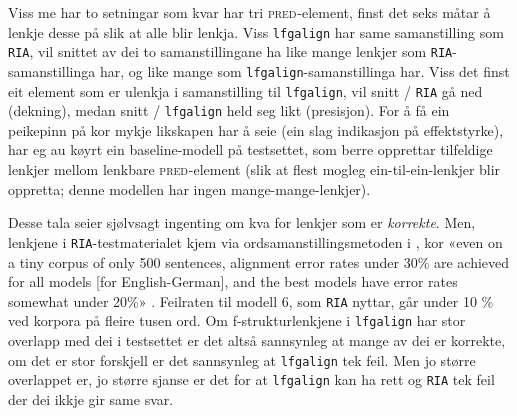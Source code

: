 \documentclass[12pt,a4paper,oneside,draft]{report}
\newcommand{\F}[2]{\textsc{#1}\ensuremath{_{#2}}}
\newcommand{\PRED}{\F{pred}{}}
\begin{document}
Viss me har to setningar som kvar har tri \PRED{}-element, finst det
 seks måtar å lenkje desse på slik at alle blir lenkja. Viss
 \texttt{lfgalign} har same samanstilling som \texttt{RIA}, vil snittet av dei to
 samanstillingane ha like mange lenkjer som \texttt{RIA}-samanstillinga har,
 og like mange som \texttt{lfgalign}-samanstillinga har. Viss det finst eit
 element som er ulenkja i samanstilling til \texttt{lfgalign}, vil snitt /
 \texttt{RIA} gå ned (dekning), medan snitt / \texttt{lfgalign} held seg likt
 (presisjon). For å få ein peikepinn på kor mykje likskapen har å seie
 (ein slag indikasjon på effektstyrke), har eg au køyrt ein
 baseline-modell på testsettet, som berre opprettar tilfeldige lenkjer
 mellom lenkbare \PRED{}-element (slik at flest mogleg
 ein-til-ein-lenkjer blir oppretta; denne modellen har ingen
 mange-mange-lenkjer).

Desse tala seier sjølvsagt ingenting om kva for lenkjer som er
 \emph{korrekte}. Men, lenkjene i \texttt{RIA}-testmaterialet kjem via
 ordsamanstillingsmetoden i \citet{och2003scv}, kor «even on a tiny
 corpus of only 500 sentences, alignment error rates under 30\% are
 achieved for all models [for English-German], and the best models
 have error rates somewhat under 20\%»
 \citep[s.~36]{och2003scv}. Feilraten til modell 6, som \texttt{RIA} nyttar,
 går under 10 \% ved korpora på fleire tusen ord. Om f\hyp{}strukturlenkjene
 i \texttt{lfgalign} har stor overlapp med dei i testsettet er det altså
 sannsynleg at mange av dei er korrekte, om det er stor forskjell er
 det sannsynleg at \texttt{lfgalign} tek feil. Men jo større overlappet er,
 jo større sjanse er det for at \texttt{lfgalign} kan ha rett og \texttt{RIA} tek
 feil der dei ikkje gir same svar.
\end{document}

